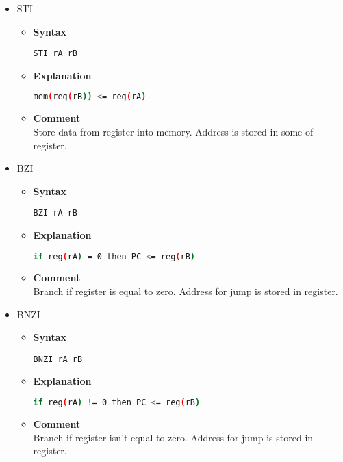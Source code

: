 \begin{itemize}
    \item STI
    \begin{itemize}
        \item \textbf{Syntax}
        \begin{lstlisting}[language={[markII]Assembler}, frame=single]
    STI rA rB
        \end{lstlisting}
        \item \textbf{Explanation}
        \begin{lstlisting}[language=bash, frame=single]
    mem(reg(rB)) <= reg(rA)
        \end{lstlisting}
        \item \textbf{Comment} \\
    Store data from register into memory. Address is stored in some of register.
    \end{itemize}

    \item BZI
    \begin{itemize}
        \item \textbf{Syntax}
        \begin{lstlisting}[language={[markII]Assembler}, frame=single]
    BZI rA rB
        \end{lstlisting}
        \item \textbf{Explanation}
        \begin{lstlisting}[language=bash, frame=single]
    if reg(rA) = 0 then PC <= reg(rB)
        \end{lstlisting}
        \item \textbf{Comment} \\
    Branch if register is equal to zero. Address for jump is stored in register.
    \end{itemize}

    \item BNZI
    \begin{itemize}
        \item \textbf{Syntax}
        \begin{lstlisting}[language={[markII]Assembler}, frame=single]
    BNZI rA rB
        \end{lstlisting}
        \item \textbf{Explanation}
        \begin{lstlisting}[language=bash, frame=single]
    if reg(rA) != 0 then PC <= reg(rB)
        \end{lstlisting}
        \item \textbf{Comment} \\
    Branch if register isn't equal to zero. Address for jump is stored in register.
    \end{itemize}


\end{itemize}

